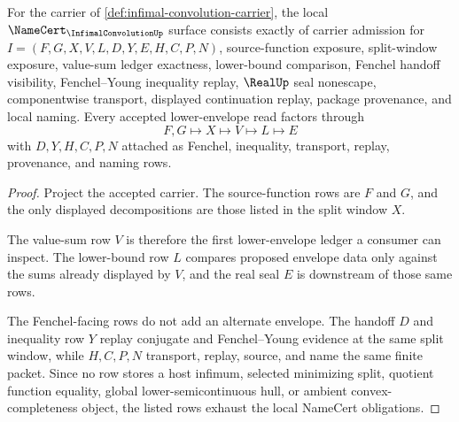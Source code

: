 \begin{theorem}
\label{thm:infimal-convolution-namecert-obligations}
For the carrier of \autoref{def:infimal-convolution-carrier}, the local $\NameCert_{\InfimalConvolutionUp}$ surface consists exactly of carrier admission for $I=(F,G,X,V,L,D,Y,E,H,C,P,N)$, source-function exposure, split-window exposure, value-sum ledger exactness, lower-bound comparison, Fenchel handoff visibility, Fenchel--Young inequality replay, $\RealUp$ seal nonescape, componentwise transport, displayed continuation replay, package provenance, and local naming. Every accepted lower-envelope read factors through
$$
F,G \longmapsto X \longmapsto V \longmapsto L \longmapsto E
$$
with $D,Y,H,C,P,N$ attached as Fenchel, inequality, transport, replay, provenance, and naming rows.
\end{theorem}
\begin{proof}
Project the accepted carrier. The source-function rows are $F$ and $G$, and the only displayed decompositions are those listed in the split window $X$.

The value-sum row $V$ is therefore the first lower-envelope ledger a consumer can inspect. The lower-bound row $L$ compares proposed envelope data only against the sums already displayed by $V$, and the real seal $E$ is downstream of those same rows.

The Fenchel-facing rows do not add an alternate envelope. The handoff $D$ and inequality row $Y$ replay conjugate and Fenchel--Young evidence at the same split window, while $H,C,P,N$ transport, replay, source, and name the same finite packet. Since no row stores a host infimum, selected minimizing split, quotient function equality, global lower-semicontinuous hull, or ambient convex-completeness object, the listed rows exhaust the local NameCert obligations.
\end{proof}

